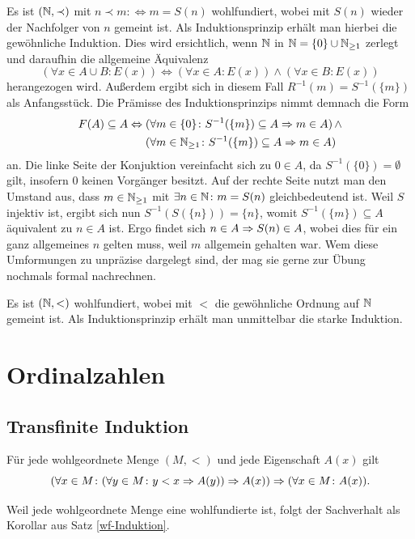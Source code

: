 Es ist $(\mathbb N,\prec)$ mit $n\prec m :\Leftrightarrow m=S(n)$ wohlfundiert,
wobei mit $S(n)$ wieder der Nachfolger von $n$ gemeint ist.
Als Induktionsprinzip erhält man hierbei die gewöhnliche Induktion.
Dies wird ersichtlich, wenn $\mathbb N$ in $\mathbb N=\{0\}\cup\mathbb N_{\ge 1}$ zerlegt
und daraufhin die allgemeine Äquivalenz
\[(\forall x\in A\cup B\colon E(x)) \Leftrightarrow
(\forall x\in A\colon E(x))\land (\forall x\in B\colon E(x))\]
herangezogen wird. Außerdem ergibt sich in diesem Fall
$R^{-1}(m) = S^{-1}(\{m\})$ als Anfangsstück. Die Prämisse des
Induktionsprinzips nimmt demnach die Form
\begin{align*}
F(A)\subseteq A \Leftrightarrow\; &(\forall m\in\{0\}\colon S^{-1}(\{m\})\subseteq A\Rightarrow m\in A)\,{\land}\\
&(\forall m\in\mathbb N_{\ge 1}\colon S^{-1}(\{m\})\subseteq A\Rightarrow m\in A)
\end{align*}
an. Die linke Seite der Konjuktion vereinfacht sich zu $0\in A$,
da $S^{-1}(\{0\})=\emptyset$ gilt, insofern $0$ keinen Vorgänger besitzt.
Auf der rechte Seite nutzt man
den Umstand aus, dass $m\in\mathbb N_{\ge 1}$ mit $\exists n\in\mathbb N\colon m=S(n)$
gleichbedeutend ist. Weil $S$ injektiv ist, ergibt sich nun
$S^{-1}(S(\{n\})) = \{n\}$, womit $S^{-1}(\{m\})\subseteq A$
äquivalent zu $n\in A$ ist. Ergo findet sich $n\in A\Rightarrow S(n)\in A$,
wobei dies für ein ganz allgemeines $n$ gelten muss, weil $m$ allgemein
gehalten war. Wem diese Umformungen zu unpräzise dargelegt sind, der mag
sie gerne zur Übung nochmals formal nachrechnen.

Es ist $(\mathbb N,<)$ wohlfundiert, wobei mit $<$ die gewöhnliche Ordnung
auf $\mathbb N$ gemeint ist. Als Induktionsprinzip erhält man unmittelbar die starke
Induktion.


\section{Ordinalzahlen}

\subsection{Transfinite Induktion}

\begin{Satz}%
\newlinefirst
Für jede wohlgeordnete Menge $(M,<)$ und jede Eigenschaft $A(x)$ gilt
\[(\forall x\in M\colon (\forall y\in M\colon y<x\Rightarrow A(y))\Rightarrow A(x))
\Rightarrow (\forall x\in M\colon A(x)).\]
\end{Satz}
\begin{Beweis}
Weil jede wohlgeordnete Menge eine wohlfundierte ist, folgt der
Sachverhalt als Korollar aus Satz \ref{wf-Induktion}.\,\qedsymbol
\end{Beweis}

